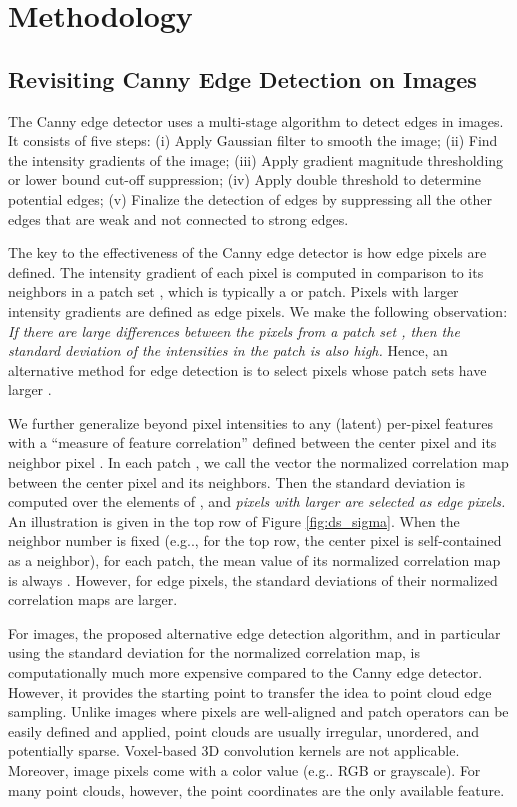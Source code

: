 \documentclass[10pt,twocolumn,letterpaper]{article}
\makeatletter
\DeclareRobustCommand\onedot{\futurelet\@let@token\@onedot}
\def\@onedot{\ifx\@let@token.\else.\null\fi\xspace}
\def\eg{e.g\onedot} \def\Eg{E.g\onedot}
\makeatother
\begin{document}
\section{Methodology}
\label{sec:method}
\subsection{Revisiting Canny Edge Detection on Images}
The Canny edge detector uses a multi-stage algorithm to detect edges in images. It consists of five steps: (i) Apply Gaussian filter to smooth the image; (ii) Find the intensity gradients of the image; (iii) Apply gradient magnitude thresholding or lower bound cut-off suppression; (iv) Apply double threshold to determine potential edges; (v) Finalize the detection of edges by suppressing all the other edges that are weak and not connected to strong edges. 

The key to the effectiveness of the Canny edge detector is how edge pixels are defined. 
The intensity gradient of each pixel  is computed in comparison to its neighbors in a patch set , which is typically a  or  patch. Pixels with larger intensity gradients are defined as edge pixels. We make the following observation: 
\emph{If there are large differences between the pixels from a patch set , then the standard deviation  of the intensities in the patch is also high.}
Hence, an alternative method for edge detection is to select pixels whose patch sets have larger .

We further generalize beyond pixel intensities to any (latent) per-pixel features  with a \enquote{measure of feature correlation}  defined between the center pixel  and its neighbor pixel . 
In each patch , we call the vector  the normalized correlation map between the center pixel and its neighbors.
Then the standard deviation  is computed over the elements of , and \emph{pixels with larger  are selected as edge pixels.}
An illustration is given in the top row of Figure \ref{fig:ds_sigma}. When the neighbor number  is fixed (\eg,  for the top row, the center pixel is self-contained as a neighbor), for each patch, the mean value of its normalized correlation map is always . However, for edge pixels, the standard deviations of their normalized correlation maps are larger.

For images, the proposed alternative edge detection algorithm, and in particular using the standard deviation for the normalized correlation map, is computationally much more expensive compared to the Canny edge detector. However, it provides the starting point to transfer the idea to point cloud edge sampling.
Unlike images where pixels are well-aligned and patch operators can be easily defined and applied, point clouds are usually irregular, unordered, and potentially sparse. Voxel-based 3D convolution kernels are not applicable. Moreover, image pixels come with a color value (\eg RGB or grayscale). For many point clouds, however, the point coordinates are the only available feature.
\end{document}
